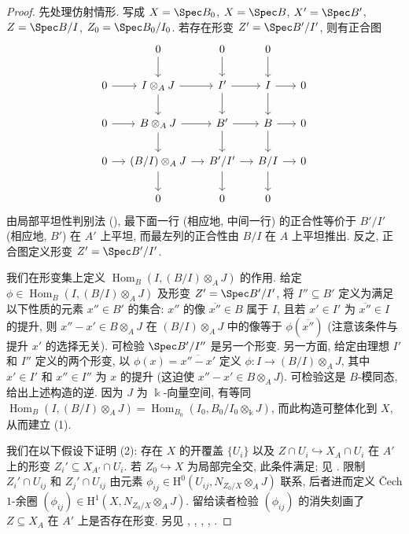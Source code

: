\begin{proof}
先处理仿射情形. 写成 $X=\Spec B_0$, $X=\Spec B$, $X'=\Spec B'$, $Z=\Spec B/I$, $Z_0=\Spec B_0/I_0$. 若存在形变 $Z'=\Spec B'/I'$, 则有正合图
\[
\begin{tikzcd}[column sep=small]
&0\arrow[d]&0\arrow[d]&0\arrow[d]&\\
0\arrow[r]&I\otimes_AJ\arrow[r]\arrow[d]&I'\arrow[r]\arrow[d]&I\arrow[r]\arrow[d]&0\\
0\arrow[r]&B\otimes_AJ\arrow[r]\arrow[d]&B'\arrow[r]\arrow[d]&B\arrow[r]\arrow[d]&0\\
0\arrow[r]&(B/I)\otimes_AJ\arrow[r]\arrow[d]&B'/I'\arrow[r]\arrow[d]&B/I\arrow[r]\arrow[d]&0\\
&0&0&0&
\end{tikzcd}
\]
由局部平坦性判别法 (), 最下面一行 (相应地, 中间一行) 的正合性等价于 $B'/I'$ (相应地, $B'$) 在 $A'$ 上平坦, 而最左列的正合性由 $B/I$ 在 $A$ 上平坦推出. 反之, 正合图定义形变 $Z'=\Spec B'/I'$.

我们在形变集上定义 $\operatorname{Hom}_B(I,(B/I)\otimes_AJ)$ 的作用. 给定 $\phi\in\operatorname{Hom}_B(I,(B/I)\otimes_AJ)$ 及形变 $Z'=\Spec B'/I'$, 将 $I''\subseteq B'$ 定义为满足以下性质的元素 $x''\in B'$ 的集合: $x''$ 的像 $\overline{x''}\in B$ 属于 $I$, 且若 $x'\in I'$ 为 $\overline{x''}\in I$ 的提升, 则 $x''-x'\in B\otimes_AJ$ 在 $(B/I)\otimes_AJ$ 中的像等于 $\phi(\overline{x''})$ (注意该条件与提升 $x'$ 的选择无关). 可检验 $\Spec B'/I''$ 是另一个形变. 另一方面, 给定由理想 $I'$ 和 $I''$ 定义的两个形变, 以 $\phi(x)=\overline{x''-x'}$ 定义 $\phi:I\to(B/I)\otimes_AJ$, 其中 $x'\in I'$ 和 $x''\in I''$ 为 $x$ 的提升 (这迫使 $x''-x'\in B\otimes_AJ$). 可检验这是 $B$-模同态, 给出上述构造的逆. 因为 $J$ 为 $\Bbbk$-向量空间, 有等同 $\operatorname{Hom}_B(I,(B/I)\otimes_AJ)=\operatorname{Hom}_{B_0}(I_0,B_0/I_0\otimes_{\Bbbk}J)$, 而此构造可整体化到 $X$, 从而建立 (1).

我们在以下假设下证明 (2): 存在 $X$ 的开覆盖 $\{U_i\}$ 以及 $Z\cap U_i\hookrightarrow X_A\cap U_i$ 在 $A'$ 上的形变 $Z_i'\subseteq X_{A'}\cap U_i$. 若 $Z_0\hookrightarrow X$ 为局部完全交, 此条件满足; 见 \cite[引理 $2.12$]{Kol96}. 限制 $Z_i'\cap U_{ij}$ 和 $Z_j'\cap U_{ij}$ 由元素 $\phi_{ij}\in\mathrm H^0(U_{ij},N_{Z_0/X}\otimes_AJ)$ 联系, 后者进而定义 Čech $1$-余圈 $(\phi_{ij})\in\mathrm H^1(X,N_{Z_0/X}\otimes_AJ)$. 留给读者检验 $(\phi_{ij})$ 的消失刻画了 $Z\subseteq X_A$ 在 $A'$ 上是否存在形变. 另见 \cite[\S $5$]{FGAIII}, \cite[引理 $6.7$]{Art69b}, \cite[命题 $2.5$]{Kol96}, \cite[定理 $2.5$]{Vis97}, \cite[定理 $6.2$]{Har10}.
\end{proof}
